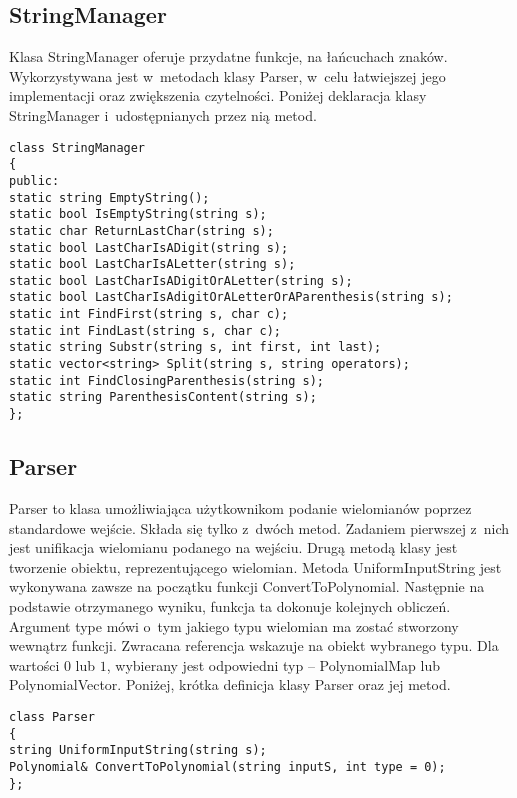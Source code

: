 \subsection{StringManager}

Klasa StringManager oferuje przydatne funkcje, na łańcuchach znaków. Wykorzystywana jest w~metodach klasy Parser, w~celu łatwiejszej jego implementacji oraz zwiększenia czytelności. Poniżej deklaracja klasy StringManager i~udostępnianych przez nią metod.

\begin{lstlisting}
class StringManager
{
public:
static string EmptyString();
static bool IsEmptyString(string s);
static char ReturnLastChar(string s);
static bool LastCharIsADigit(string s);
static bool LastCharIsALetter(string s);
static bool LastCharIsADigitOrALetter(string s);
static bool LastCharIsAdigitOrALetterOrAParenthesis(string s);
static int FindFirst(string s, char c);
static int FindLast(string s, char c);
static string Substr(string s, int first, int last);
static vector<string> Split(string s, string operators);
static int FindClosingParenthesis(string s);
static string ParenthesisContent(string s);
};
\end{lstlisting}


\subsection{Parser}
Parser to klasa umożliwiająca użytkownikom podanie wielomianów poprzez standardowe wejście. Składa się tylko z~dwóch metod. Zadaniem pierwszej z~nich jest unifikacja wielomianu podanego na wejściu. Drugą metodą klasy jest tworzenie obiektu, reprezentującego wielomian. Metoda UniformInputString jest wykonywana zawsze na początku funkcji ConvertToPolynomial. Następnie na podstawie otrzymanego wyniku, funkcja ta dokonuje kolejnych obliczeń. Argument type mówi o~tym jakiego typu wielomian ma zostać stworzony wewnątrz funkcji. Zwracana referencja wskazuje na obiekt wybranego typu. Dla wartości $0$ lub $1$, wybierany jest odpowiedni typ -- PolynomialMap lub PolynomialVector. Poniżej, krótka definicja klasy Parser oraz jej metod.

\begin{lstlisting}
class Parser
{
string UniformInputString(string s);
Polynomial& ConvertToPolynomial(string inputS, int type = 0);
};
\end{lstlisting}


